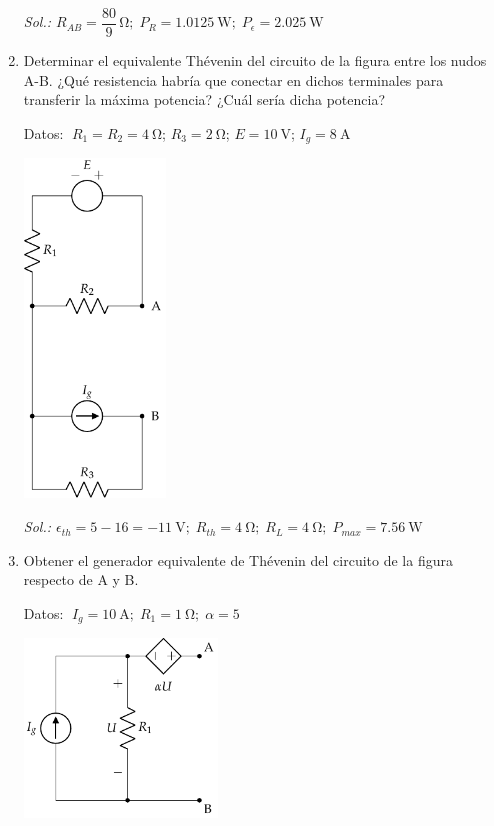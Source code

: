 \begin{enumerate}
    \vspace{-2mm}
    \emph{Sol.:\;
      $R_{AB} = \dfrac{80}{9}\,\si{\ohm}; \; P_R = \qty{1.0125}{\watt}; \;
      P_\epsilon = \qty{2.025}{\watt}$}


  \item Determinar el equivalente Thévenin del circuito de la figura
    entre los nudos A-B. ¿Qué resistencia habría que conectar en
    dichos terminales para transferir la máxima potencia? ¿Cuál sería
    dicha potencia?

    Datos: $\; R_1 = R_2 = \qty{4}{\ohm}$;\; $R_3 = \qty{2}{\ohm}$;\; $E = \qty{10}{\volt}$;\; $I_g = \qty{8}{\ampere}$

    \vspace{-3mm}
    \begin{center}
      \includegraphics[height=9cm]{../figs/ej17_BT1.pdf}
    \end{center}

    \emph{Sol.:\;
      $\epsilon_{th}=5-16=\qty{-11}{\volt};\; R_{th}=\qty{4}{\ohm};\;
      R_L=\qty{4}{\ohm};\;P_{max}=\qty{7.56}{\watt}$}


  \item Obtener el generador equivalente de Thévenin del circuito de la figura respecto de A y B.
  
    Datos: $\; I_g=\qty{10}{\ampere};\; R_1=\qty{1}{\ohm};\; \alpha=5$
    \begin{center}
      \includegraphics[height=4.75cm]{../figs/Thevenin1.pdf}
    \end{center}


\end{enumerate}
